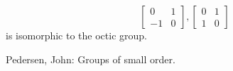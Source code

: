 \documentclass[12pt]{article}
\begin{document}
$$\left[ \begin{array}{cc}
0 & 1 \\
-1 & 0 
\end{array}\right],\left[ \begin{array}{cc}
0 & 1 \\
1 & 0 
\end{array}\right]$$
is isomorphic to the octic group.

\begin{thebibliography}{1}
 Pedersen, John: Groups of small order. 
\end{thebibliography}
\end{document}
